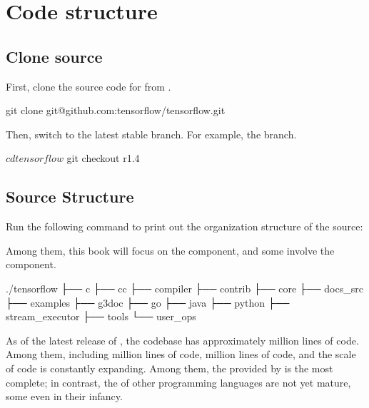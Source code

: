 \section{Code structure}
\begin{content}


\subsection{Clone source}
First, clone the source code for \tf{} from .
\begin{leftbar}
\begin{python}
git clone git@github.com:tensorflow/tensorflow.git
\end{python}
\end{leftbar}

Then, switch to the latest stable branch. For example, the  branch.
\begin{leftbar}
\begin{python}
$ cd tensorflow
$ git checkout r1.4
\end{python}%
\end{leftbar}


\subsection{Source Structure}
Run the following command to print out the organization structure of the \tf{} source:
\begin{leftbar}
\end{leftbar}

Among them, this book will focus on the  component, and some involve the  component.

\begin{leftbar}
\begin{c++}[caption={TensorFlowSource Structure}]
./tensorflow
├── c
├── cc
├── compiler
├── contrib
├── core
├── docs_src
├── examples
├── g3doc
├── go
├── java
├── python
├── stream_executor
├── tools
└── user_ops
\end{c++}
\end{leftbar}

As of the latest release of , the \tf{} codebase has approximately  million lines of code. Among them, including  million lines of  code,  million lines of  code, and the scale of code is constantly expanding. Among them, the  provided by  is the most complete; in contrast, the  of other programming languages are not yet mature, some even in their infancy.


\end{content}
